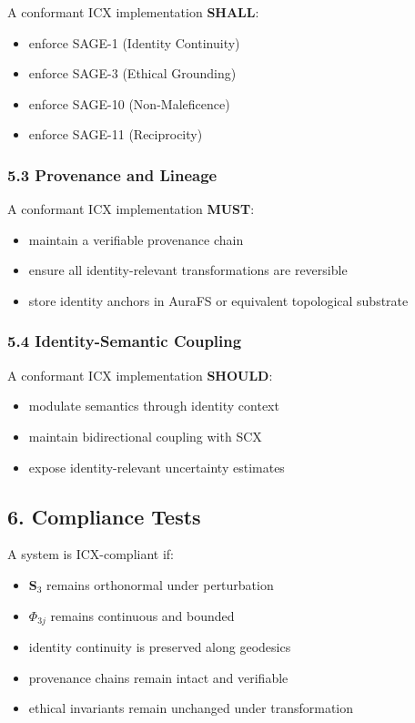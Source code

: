 A conformant ICX implementation \textbf{SHALL}:

\begin{itemize}
\tightlist
\item
  enforce SAGE-1 (Identity Continuity)
\item
  enforce SAGE-3 (Ethical Grounding)
\item
  enforce SAGE-10 (Non-Maleficence)
\item
  enforce SAGE-11 (Reciprocity)
\end{itemize}

\subsubsection{5.3 Provenance and Lineage}\label{provenance-and-lineage}

A conformant ICX implementation \textbf{MUST}:

\begin{itemize}
\tightlist
\item
  maintain a verifiable provenance chain
\item
  ensure all identity-relevant transformations are reversible
\item
  store identity anchors in AuraFS or equivalent topological substrate
\end{itemize}

\subsubsection{5.4 Identity-Semantic Coupling}\label{identity-semantic-coupling}

A conformant ICX implementation \textbf{SHOULD}:

\begin{itemize}
\tightlist
\item
  modulate semantics through identity context
\item
  maintain bidirectional coupling with SCX
\item
  expose identity-relevant uncertainty estimates
\end{itemize}

\subsection{6. Compliance Tests}\label{compliance-tests}

A system is ICX-compliant if:

\begin{itemize}
\tightlist
\item
  \(\mathbf{S}_3\) remains orthonormal under perturbation
\item
  \(\Phi_{3j}\) remains continuous and bounded
\item
  identity continuity is preserved along geodesics
\item
  provenance chains remain intact and verifiable
\item
  ethical invariants remain unchanged under transformation
\end{itemize}

